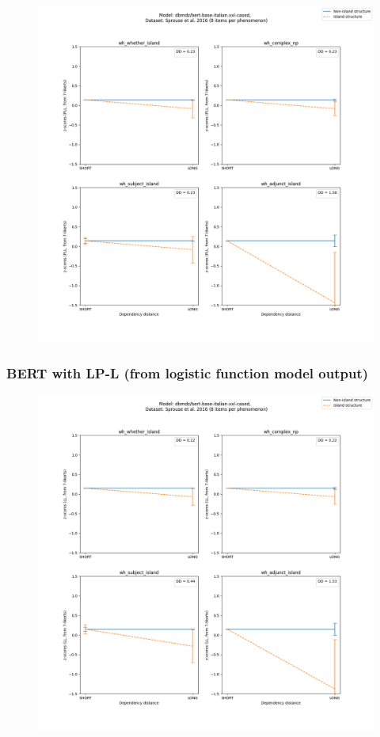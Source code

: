 \begin{figure}[h]
	\centering
	\includegraphics[width=1\textwidth]{images/AppendixA/Sprouse_wh_dbmdz_bert-base-italian-xxl-cased_PLL-zscores-likert-2022-07-11.png} 
\end{figure}

\clearpage
\subsubsection{BERT with LP-L (from logistic function model output)}
\begin{figure}[h]
	\centering
	\includegraphics[width=1\textwidth]{images/AppendixA/Sprouse_wh_dbmdz_bert-base-italian-xxl-cased_LL-zscores-likert-2022-07-11.png} 
\end{figure}

